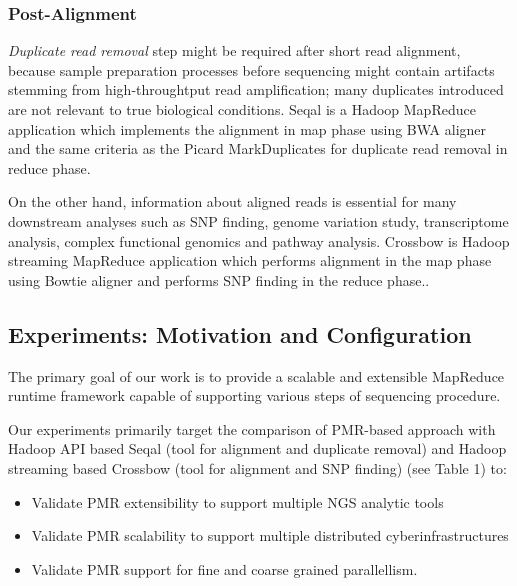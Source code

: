 \documentclass{acm_proc_article-sp}
\begin{document}
\subsubsection{Post-Alignment}
\textit{Duplicate read removal} step might be required  after short read alignment, because sample preparation processes before sequencing might contain artifacts stemming from high-throughtput read amplification; many duplicates introduced are not relevant to true biological conditions. Seqal is a Hadoop MapReduce application which implements the alignment in map phase using BWA aligner and the same criteria as the Picard MarkDuplicates\cite{seal2011,seal_2011_mapred} for duplicate read removal in reduce phase.

On the other hand, information about aligned reads is essential for many downstream analyses such as SNP finding, genome variation study, transcriptome analysis, complex functional genomics and pathway analysis.
Crossbow is Hadoop streaming MapReduce application which performs alignment in the map phase using Bowtie aligner and  performs SNP finding in the reduce phase.\cite{langmead2009}. 


\subsection{Experiments: Motivation and Configuration}

The primary goal of our work is to provide a scalable and extensible
MapReduce runtime framework capable of supporting various steps of
sequencing procedure.

Our experiments primarily target the comparison of PMR-based approach
with Hadoop API based Seqal (tool for alignment and duplicate removal)
and Hadoop streaming based Crossbow (tool for alignment and SNP
finding) (see Table 1) to:
\begin{itemize}
\item{Validate PMR extensibility to support multiple NGS analytic tools}
\item{Validate PMR scalability to support multiple distributed cyberinfrastructures}
\item{Validate PMR support for fine and coarse grained parallellism}.
\end{itemize}
\end{document}
